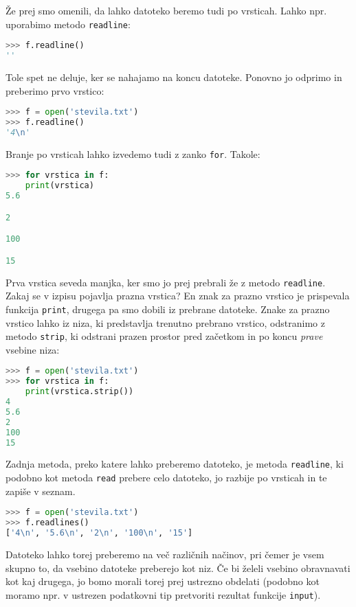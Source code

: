 Že prej smo omenili, da lahko datoteko beremo tudi po vrsticah. Lahko npr. uporabimo metodo \texttt{readline}:
\begin{lstlisting}[language=Python, showstringspaces=false]
>>> f.readline()
''
\end{lstlisting}
Tole spet ne deluje, ker se nahajamo na koncu datoteke. Ponovno jo odprimo in preberimo prvo vrstico:
\begin{lstlisting}[language=Python, showstringspaces=false]
>>> f = open('stevila.txt')
>>> f.readline()
'4\n'
\end{lstlisting}
Branje po vrsticah lahko izvedemo tudi z zanko \texttt{for}. Takole:
\begin{lstlisting}[language=Python, showstringspaces=false]
>>> for vrstica in f:
	print(vrstica)
5.6

2

100

15
\end{lstlisting}
Prva vrstica seveda manjka, ker smo jo prej prebrali že z metodo \texttt{readline}. Zakaj se v izpisu pojavlja prazna vrstica? En znak za prazno vrstico je prispevala funkcija \texttt{print}, drugega pa smo dobili iz prebrane datoteke. Znake za prazno vrstico lahko iz niza, ki predstavlja trenutno prebrano vrstico, odstranimo z metodo \texttt{strip}, ki odstrani prazen prostor pred začetkom in po koncu \emph{prave} vsebine niza:
\begin{lstlisting}[language=Python, showstringspaces=false]
>>> f = open('stevila.txt')
>>> for vrstica in f:
	print(vrstica.strip())
4
5.6
2
100
15
\end{lstlisting}

Zadnja metoda, preko katere lahko preberemo datoteko, je metoda \texttt{readline}, ki podobno kot metoda \texttt{read} prebere celo datoteko, jo razbije po vrsticah in te zapiše v seznam.
\begin{lstlisting}[language=Python, showstringspaces=false]
>>> f = open('stevila.txt')
>>> f.readlines()
['4\n', '5.6\n', '2\n', '100\n', '15']
\end{lstlisting}

Datoteko lahko torej preberemo na več različnih načinov, pri čemer je vsem skupno to, da vsebino datoteke preberejo kot niz. Če bi želeli vsebino obravnavati kot kaj drugega, jo bomo morali torej prej ustrezno obdelati (podobno kot moramo npr. v ustrezen podatkovni tip pretvoriti rezultat funkcije \texttt{input}).

